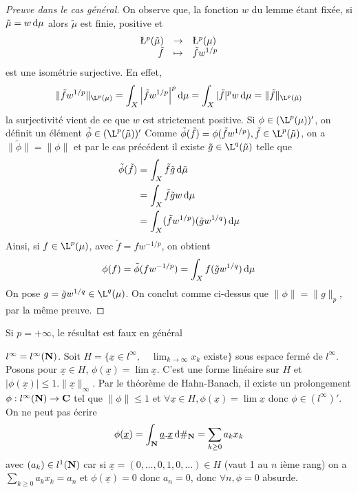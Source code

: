 \begin{proof}[Preuve dans le cas général]
On observe que, la fonction $w$ du lemme étant fixée, si $\tilde{\mu}=w\mathop{}\!\mathrm d\mu$ alors $\tilde{\mu}$ est finie, positive et
\[
    \begin{array}{rcl}
    \L^p(\tilde{\mu})& \to& \L^{p}(\mu) \\
    \tilde{f}&\mapsto &\tilde{f}w^{1/p}
    \end{array}\] est une isométrie surjective.
En effet,
\[ \|\tilde{f}w^{1/p}\|_{\L^p(\mu)}=\int_X\left| \tilde{f}w^{1/p}\right|^p\diff\mu =\int_X|\tilde{f}|^p w\diff\mu = \|\tilde{f}\|_{\L^p(\tilde{\mu})}\]
la surjectivité vient de ce que $w$ est strictement positive.
Si $\phi\in (\L^p(\mu))'$, on définit un élément $\tilde{\phi} \in (\L^p(\tilde{\mu}))'$
Comme $\tilde{\phi}(\tilde{f}) =\phi(\tilde{f}w^{1/p}), \tilde{f}\in  \L^p(\tilde{\mu})$,
on a $\|\tilde{\phi}\|=\|\phi\|$ et par le cas précédent il existe $\tilde{g}\in \L^q(\tilde{\mu})$ telle que
\begin{align*}
\tilde{\phi} (\tilde{f}) &= \int_X\tilde{f}\tilde{g} \mathop{}\!\mathrm d\tilde{\mu}\\
    &= \int_X\tilde{f}\tilde{g} w\mathop{}\!\mathrm d\mu\\
&= \int_X(\tilde{f}w^{1/p})(\tilde{g}w^{1/q}) \mathop{}\!\mathrm d\mu
\end{align*}
Ainsi, si $ f\in \L^p(\mu)$, avec $\tilde{f}=fw^{-1/p}$, on obtient \[\phi(f)= \tilde{\phi}(fw^{-1/p}) =\int_X f(\tilde{g}w^{1/q})\mathop{}\!\mathrm d\mu\]
On pose $g= \tilde{g}w^{1/q} \in \L^q(\mu)$. On conclut comme ci-dessus que $\|\phi\|=\|g\|_p$, par la même preuve.
\end{proof}

\begin{rem}
Si $p=+\infty$, le résultat est faux en général
\end{rem}

\begin{ex}
$l^\infty= l^\infty(\mathbf N)$. Soit $H=\{ \underline{x}\in l^\infty,\quad  \lim_{k\to\infty}x_k \text{ existe}\}$
sous espace fermé de $l^\infty$.
Posons pour $\underline{x}\in H$, $\phi(\underline{x}) = \lim \underline{x}$. C'est une forme linéaire sur $H$ 
et $|\phi(\underline{x})|\leq 1.\| \underline{x}\|_{\infty}$.
Par le théorème de Hahn-Banach, il existe un prolongement $\phi: l^\infty (\mathbf N)\to \mathbf C$ tel que $\|\phi\|\leq 1$
et $\forall \underline{x}\in H,\phi(\underline{x}) =\lim \underline{x}$ donc $\phi\in (l^\infty)'$.
On ne peut pas écrire
\[ \phi(\underline{x}) = \int_{\mathbf N}\underline{a}.\underline{x}\mathop{}\!\mathrm d\#_{\mathbf N}= \sum_{k\geq 0}a_kx_k\]
avec $(a_k)\in l^1(\mathbf N)$ car si $\underline{x}= (0,\dots,0,1,0,\dots) \in H$ (vaut 1 au $n$ ième rang)
on a $\sum_{k\geq 0} a_k x_k = a_n$ et $\phi(\underline{x}) =0$ donc $a_n=0$, donc $\forall n, \phi=0$ absurde.
\end{ex}

